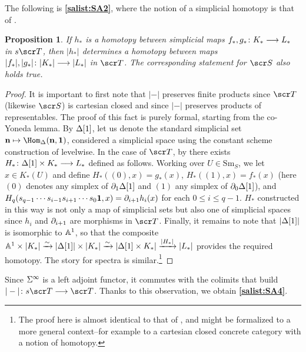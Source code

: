 \documentclass{amsart}
\newtheorem{prop}[thm]{Proposition}
\theoremstyle{definition}
\newcommand{\bn}{\mathbf{n}}
\begin{document}
The following is \textbf{\ref{salist:SA2}}, where the notion of a simplicial homotopy is that of \cite[Definitions 5.1]{may67simpob}. 
\begin{prop}\label{prop:3.1}
If $h_*$ is a homotopy between simplicial maps $f_*, g_* \colon K_* \longrightarrow L_*$ in $s\sT$, then $|h_*|$ determines a homotopy between maps $|f_*|, |g_*| \colon |K_*| \longrightarrow |L_*|$ in $\sT$. The corresponding statement for $\sS$ also holds true.
\end{prop}
\begin{proof}
It is important to first note that $|-|$ preserves finite products since $\sT$ (likewise $\sS$) is cartesian closed and since $|-|$ preserves products of representables. The proof of this fact is purely formal, starting from the co-Yoneda lemma. By $\Delta[1]$, let us denote the standard simplicial set $\bn \mapsto \Hom_{\DE}(\bn,\mathbf{1})$, considered a simplicial space using the constant scheme construction of \cite[Exposé I, 1.8]{SGA3T1} levelwise. In the case of $\sT$, by \cite[Proposition 6.2]{may67simpob} there exists $H_* \colon \Delta[1] \times K_* \longrightarrow L_*$ defined as follows. Working over $U \in \mathrm{Sm}_S$, we let $x \in K_*(U)$ and define $H_*((0),x)=g_*(x)$, $H_*((1),x) = f_*(x)$ (here $(0)$ denotes any simplex of $\partial_1\Delta[1]$ and $(1)$ any simplex of $\partial_0\Delta[1]$), and $H_q(s_{q-1} \cdots s_{i-1} s_{i+1} \cdots s_0 \mathbf{1},x) = \partial_{i+1}h_i(x)$ for each $0 \leq i \leq q-1$. $H_*$ constructed in this way is not only a map of simplicial sets but also one of simplicial spaces since $h_i$ and $\partial_{i+1}$ are morphisms in $\sT$. Finally, it remains to note that $|\Delta[1]|$ is isomorphic to $\mathbb{A}^1$, so that the composite $\mathbb{A}^1 \times |K_*| \xrightarrow{\sim} |\Delta[1]| \times |K_*| \xrightarrow{\sim} |\Delta[1] \times K_*| \xrightarrow{|H_*|} |L_*|$ provides the required homotopy. The story for spectra is similar.\footnote{The proof here is almost identical to that of \cite[Corollary 11.10]{May72}, and might be formalized to a more general context--for example to a cartesian closed concrete category with a notion of homotopy.}
\end{proof}

Since $\Sigma^{\infty}$ is a left adjoint functor, it commutes with the colimits that build $|-| \colon s\sT \rtarr \sT$. Thanks to this observation, we obtain \textbf{\ref{salist:SA4}}.
\end{document}
